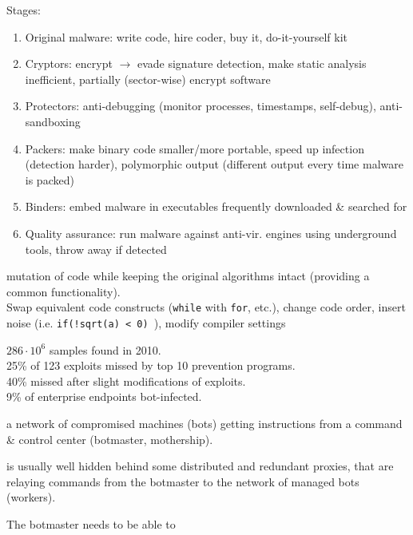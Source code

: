 Stages:
\begin{enumerate}
\item Original malware: write code, hire coder, buy it, do-it-yourself kit
\item Cryptors: encrypt $\to$ evade signature detection, make static analysis inefficient, partially (sector-wise) encrypt software
\item Protectors: anti-debugging (monitor processes, timestamps, self-debug), anti-sandboxing
\item Packers: make binary code smaller/more portable, speed up infection (detection harder), polymorphic output (different output every time malware is packed)
\item Binders: embed malware in executables frequently downloaded \& searched for
\item Quality assurance: run malware against anti-vir. engines using underground tools, throw away if detected
\end{enumerate} 

 mutation of code while keeping the original algorithms intact (providing a common functionality).\\
Swap equivalent code constructs ({\tt while} with {\tt for}, etc.), change code order, insert noise (i.e. {\tt if(!sqrt(a) < 0) }), modify compiler settings

 $286 \cdot 10^{6}$ samples found in 2010.\\
25\% of 123 exploits missed by top 10 prevention programs.\\
40\% missed after slight modifications of exploits.\\
9\% of enterprise endpoints bot-infected.


 a network of compromised machines (bots) getting instructions from a command \& control center (botmaster, mothership).

 is usually well hidden behind some distributed and redundant proxies, that are relaying commands from the botmaster to the network of managed bots (workers).

The botmaster needs to be able to

